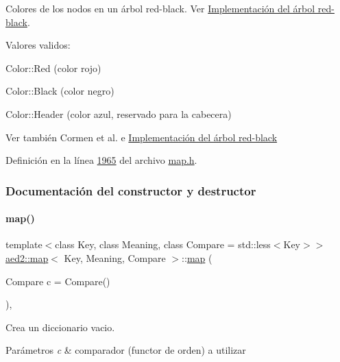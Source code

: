Colores de los nodos en un árbol red-\/black. Ver \hyperlink{Implementacion}{Implementación del árbol red-\/black}. 

Valores validos\+: \begin{DoxyItemize}
\item Color\+::\+Red (color rojo) \item Color\+::\+Black (color negro) \item Color\+::\+Header (color azul, reservado para la cabecera)\end{DoxyItemize}
\begin{DoxySeeAlso}{Ver también}
Cormen et al. \cite{CormenLeisersonRivestStein2009} e \hyperlink{Implementacion}{Implementación del árbol red-\/black} 
\end{DoxySeeAlso}


Definición en la línea \hyperlink{map_8h_source_l01965}{1965} del archivo \hyperlink{map_8h_source}{map.\+h}.



\subsubsection{Documentación del constructor y destructor}
\mbox{\label{classaed2_1_1map_a64da1d965b13eb28cdb3837bc17a18cf_a64da1d965b13eb28cdb3837bc17a18cf}} 
\paragraph{\texorpdfstring{map()}{map()}\hspace{0.1cm}{\footnotesize\ttfamily [1/3]}}
{\footnotesize\ttfamily template$<$class Key, class Meaning, class Compare = std\+::less$<$\+Key$>$$>$ \\
\hyperlink{classaed2_1_1map}{aed2\+::map}$<$ Key, Meaning, Compare $>$\+::\hyperlink{classaed2_1_1map}{map} (\begin{DoxyParamCaption}\item[{Compare}]{c = {\ttfamily Compare()} }\end{DoxyParamCaption})\hspace{0.3cm}{\ttfamily [inline]}, {\ttfamily [explicit]}}



Crea un diccionario vacio. 


\begin{DoxyParams}{Parámetros}
{\em c} & comparador (functor de orden) a utilizar \\
\hline
\end{DoxyParams}

